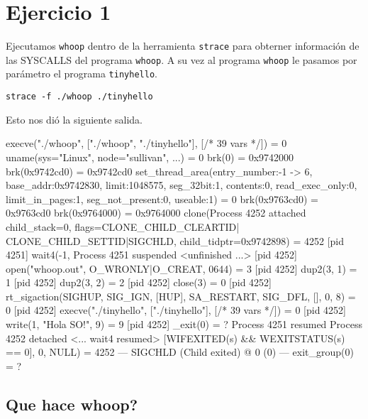 
\section{Ejercicio 1}

Ejecutamos \verb|whoop| dentro de la herramienta \verb|strace| para obterner informaci\'on de las SYSCALLS del programa \verb|whoop|.
A su vez al programa \verb|whoop| le pasamos por par\'ametro el programa \verb|tinyhello|.

\begin{framed}
\begin{verbatim}
strace -f ./whoop ./tinyhello
\end{verbatim}
\end{framed}

Esto nos di\'o la siguiente salida.

\begin{framed}
\begin{verbatimtab}
execve("./whoop", ["./whoop", "./tinyhello"], [/* 39 vars */]) = 0
uname({sys="Linux", node="sullivan", ...}) = 0
brk(0)                                  = 0x9742000
brk(0x9742cd0)                          = 0x9742cd0
set_thread_area({entry_number:-1 -> 6, base_addr:0x9742830, limit:1048575, 
    seg_32bit:1, contents:0, read_exec_only:0, limit_in_pages:1, 
    seg_not_present:0, useable:1}) = 0
brk(0x9763cd0)                          = 0x9763cd0
brk(0x9764000)                          = 0x9764000
clone(Process 4252 attached child_stack=0, flags=CLONE_CHILD_CLEARTID|
    CLONE_CHILD_SETTID|SIGCHLD, child_tidptr=0x9742898) = 4252
[pid  4251] wait4(-1, Process 4251 suspended
 <unfinished ...>
[pid  4252] open("whoop.out", O_WRONLY|O_CREAT, 0644) = 3
[pid  4252] dup2(3, 1)                  = 1
[pid  4252] dup2(3, 2)                  = 2
[pid  4252] close(3)                    = 0
[pid  4252] rt_sigaction(SIGHUP, {SIG_IGN, [HUP], SA_RESTART}, 
    {SIG_DFL, [], 0}, 8) = 0
[pid  4252] execve("./tinyhello", ["./tinyhello"], [/* 39 vars */]) = 0
[pid  4252] write(1, "Hola SO!\n", 9)   = 9
[pid  4252] _exit(0)                    = ?
Process 4251 resumed
Process 4252 detached
<... wait4 resumed> [{WIFEXITED(s) && WEXITSTATUS(s) == 0}], 0, NULL) = 4252
--- SIGCHLD (Child exited) @ 0 (0) ---
exit_group(0)                           = ?
\end{verbatimtab}
\end{framed}

\subsection{Que hace whoop?}

